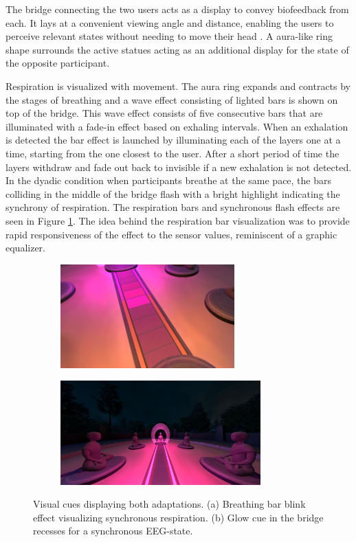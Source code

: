 \documentclass[manuscript, review = false, screen]{acmart}
\begin{document}
The bridge connecting the two users acts as a display to convey biofeedback from each. It lays at a convenient viewing angle and distance, enabling the users to perceive relevant states without needing to move their head \cite{Alger2015}. A aura-like ring shape surrounds the active statues acting as an additional display for the state of the opposite participant.

Respiration is visualized with movement. The aura ring expands and contracts by the stages of breathing and a wave effect consisting of lighted bars is shown on top of the bridge. This wave effect consists of five consecutive bars that are illuminated with a fade-in effect based on exhaling intervals. When an exhalation is detected the bar effect is launched by illuminating each of the layers one at a time, starting from the one closest to the user. After a short period of time the layers withdraw and fade out back to invisible if a new exhalation is not detected. In the dyadic condition when participants breathe at the same pace, the bars colliding in the middle of the bridge flash with a bright highlight indicating the synchrony of respiration. The respiration bars and synchronous flash effects are seen in Figure \ref{fig:breathingbar}. The idea behind the respiration bar visualization was to provide rapid responsiveness of the effect to the sensor values, reminiscent of a graphic equalizer.

\begin{figure}
\begin{subfigure}{0.45\textwidth}
\includegraphics[width=0.99\linewidth, height=4cm]{images/DYNECOM_BarSync.jpg}
\caption{ }
\label{fig:breathingbar}
\end{subfigure}
\begin{subfigure}{0.45\textwidth}
\includegraphics[width=0.99\linewidth, height=4cm]{images/glow.png}
\caption{ }
\label{fig:glow}
\end{subfigure}
\caption{Visual cues displaying both adaptations. (a) Breathing bar blink effect visualizing synchronous respiration. (b) Glow cue in the bridge recesses for a synchronous EEG-state.}
\label{fig:adaptations}
\end{figure}
\end{document}
